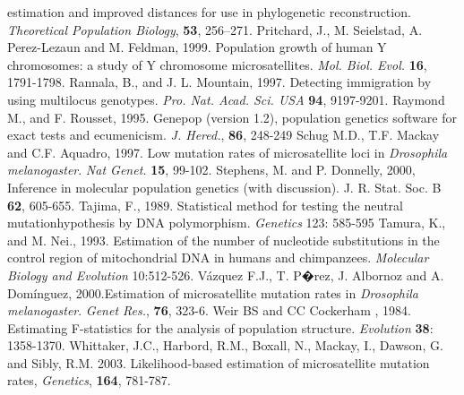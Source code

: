 \begin{thebibliography}{a}
estimation and improved distances for use in phylogenetic reconstruction. \emph{Theoretical Population Biology}, \textbf{53}, 256–271.
 Pritchard, J., M. Seielstad,
A. Perez-Lezaun and M. Feldman, 1999. Population growth of human Y
chromosomes: a study of Y chromosome microsatellites. \emph{Mol.
Biol. Evol.} \textbf{16}, 1791-1798.
Rannala, B., and J. L. Mountain, 1997. Detecting immigration by using multilocus genotypes. \emph{Pro. Nat. Acad. Sci. USA} \textbf{94}, 9197-9201.
 Raymond M., and F. Rousset, 1995. Genepop (version 1.2), population genetics software for exact tests and ecumenicism. \emph{J. Hered.}, \textbf{86}, 248-249
 Schug M.D., T.F. Mackay and C.F. Aquadro, 1997. Low mutation rates of microsatellite loci in \emph{Drosophila melanogaster}. \emph{Nat Genet.} \textbf{15}, 99-102.
 Stephens, M. and P. Donnelly,
 2000, Inference in molecular population genetics (with discussion).
 J. R. Stat. Soc. B \textbf{62}, 605-655.
 Tajima, F., 1989. Statistical method for testing the neutral mutationhypothesis by DNA polymorphism. \emph{Genetics} 
123: 585-595
  Tamura, K., and M. Nei., 1993. Estimation of the number of nucleotide substitutions in the control region of mitochondrial DNA in humans and chimpanzees. \emph{Molecular Biology and Evolution} 10:512-526.
 V\'azquez F.J., T. P�rez, J. Albornoz and A. Dom\'inguez, 2000.Estimation of microsatellite mutation rates in \emph{Drosophila melanogaster}. \emph{Genet Res.}, \textbf{76}, 323-6.
Weir BS and CC Cockerham , 1984. Estimating F-statistics for the analysis of population structure. \emph{Evolution} \textbf{38}: 1358-1370.
 Whittaker, J.C., Harbord, R.M., Boxall, N., Mackay, I.,
Dawson, G. and Sibly, R.M. 2003. Likelihood-based estimation of
microsatellite mutation rates, \emph{Genetics}, \textbf{164},
781-787.
\end{thebibliography}
